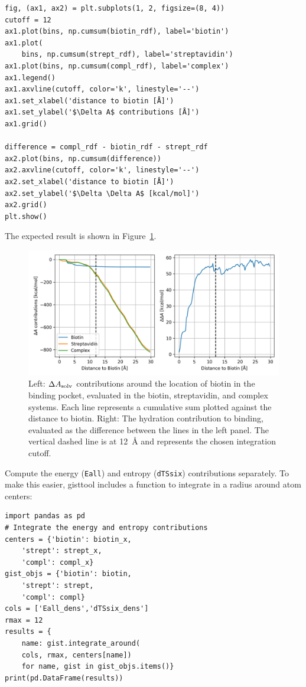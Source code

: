 \documentclass[9pt,tutorial]{livecoms}
\newcommand{\dasolv}{\Delta A_\textup{solv}}
\newcommand\inlinecode{\texttt}
\begin{document}
\begin{lstlisting}[style=python]
fig, (ax1, ax2) = plt.subplots(1, 2, figsize=(8, 4))
cutoff = 12
ax1.plot(bins, np.cumsum(biotin_rdf), label='biotin')
ax1.plot(
    bins, np.cumsum(strept_rdf), label='streptavidin')
ax1.plot(bins, np.cumsum(compl_rdf), label='complex')
ax1.legend()
ax1.axvline(cutoff, color='k', linestyle='--')
ax1.set_xlabel('distance to biotin [Å]')
ax1.set_ylabel('$\Delta A$ contributions [Å]')
ax1.grid()

difference = compl_rdf - biotin_rdf - strept_rdf
ax2.plot(bins, np.cumsum(difference))
ax2.axvline(cutoff, color='k', linestyle='--')
ax2.set_xlabel('distance to biotin [Å]')
ax2.set_ylabel('$\Delta \Delta A$ [kcal/mol]')
ax2.grid()
plt.show()
\end{lstlisting}
The expected result is shown in Figure~\ref{fig-dg-sums}.
\begin{figure}[H]
	\centering
	\includegraphics[width=1.0\linewidth]{figures/deltaA-difference.png}
	\caption{Left: $\dasolv$ contributions around the location of biotin in the binding pocket, evaluated in the biotin, streptavidin, and complex systems. Each line represents a cumulative sum plotted against the distance to biotin. Right: The hydration contribution to binding, evaluated as the difference between the lines in the left panel. The vertical dashed line is at \qty{12}{\angstrom} and represents the chosen integration cutoff.}\label{fig-dg-sums}
\end{figure}
Compute the energy (\inlinecode{Eall}) and entropy (\inlinecode{dTSsix}) contributions separately.
 To make this easier, gisttool includes a function to integrate in a radius around atom centers:
\begin{lstlisting}[style=python]
import pandas as pd
# Integrate the energy and entropy contributions
centers = {'biotin': biotin_x, 
    'strept': strept_x, 
    'compl': compl_x}
gist_objs = {'biotin': biotin, 
    'strept': strept, 
    'compl': compl}
cols = ['Eall_dens','dTSsix_dens']
rmax = 12
results = {
    name: gist.integrate_around(
    cols, rmax, centers[name])
    for name, gist in gist_objs.items()}
print(pd.DataFrame(results))
\end{lstlisting}
\end{document}
